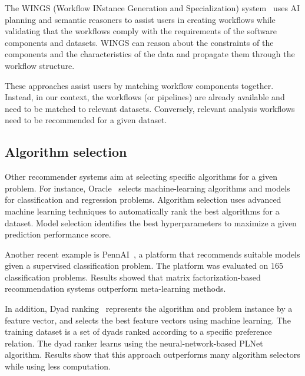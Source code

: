 \documentclass[conference]{IEEEtran}
\begin{document}
The WINGS (Workflow INstance Generation and Specialization) system~\cite{gil2010wings} uses AI planning and semantic reasoners to assist users in creating workflows while validating that the workflows comply with the requirements of the software components and datasets. WINGS can reason about the constraints of the components and the characteristics of the data and propagate them through the workflow structure.

These approaches assist users by matching workflow components together. Instead, in our context, the workflows (or pipelines) are already available and need to be matched to relevant datasets. Conversely, relevant analysis workflows need to be recommended for a given dataset.

\subsection{Algorithm selection}

Other recommender systems aim at selecting specific algorithms for a given problem. For instance, Oracle~\cite{oracle} selects machine-learning algorithms and models for classiﬁcation and regression problems. Algorithm selection uses advanced machine learning techniques to automatically rank the best algorithms for a dataset. Model selection identifies the best hyperparameters to maximize a given prediction performance score. 

Another recent example is PennAI~\cite{la2021evaluating}, a platform that recommends suitable models given a supervised classification problem. The platform was evaluated on 165 classification problems. Results showed that matrix factorization-based recommendation systems outperform meta-learning methods.

In addition, Dyad ranking~\cite{tornede2019algorithm,tornede2020extreme} represents the algorithm and problem instance by a feature vector, and selects the best feature vectors using machine learning. The training dataset is a set of dyads ranked according to a specific preference relation. The dyad ranker learns using the neural-network-based PLNet~\cite{schafer2018dyad} algorithm. Results show that this approach outperforms many algorithm selectors while using less computation. 
\end{document}
